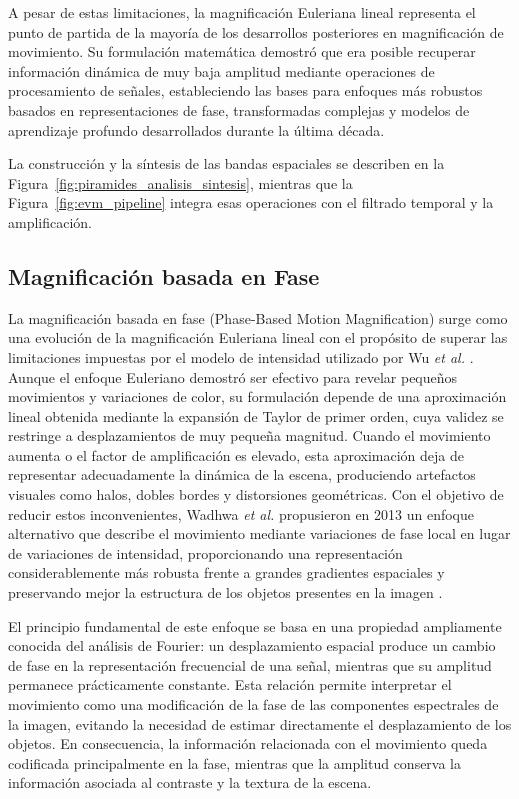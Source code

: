 A pesar de estas limitaciones, la magnificación Euleriana lineal representa el punto de partida de la mayoría de los desarrollos posteriores en magnificación de movimiento. Su formulación matemática demostró que era posible recuperar información dinámica de muy baja amplitud mediante operaciones de procesamiento de señales, estableciendo las bases para enfoques más robustos basados en representaciones de fase, transformadas complejas y modelos de aprendizaje profundo desarrollados durante la última década.

La construcción y la síntesis de las bandas espaciales se describen en la Figura~\ref{fig:piramides_analisis_sintesis}, mientras que la Figura~\ref{fig:evm_pipeline} integra esas operaciones con el filtrado temporal y la amplificación.

	\subsection{Magnificación basada en Fase}

La magnificación basada en fase (Phase-Based Motion Magnification) surge como una evolución de la magnificación Euleriana lineal con el propósito de superar las limitaciones impuestas por el modelo de intensidad utilizado por Wu \textit{et al.} \cite{wu2012eulerian}. Aunque el enfoque Euleriano demostró ser efectivo para revelar pequeños movimientos y variaciones de color, su formulación depende de una aproximación lineal obtenida mediante la expansión de Taylor de primer orden, cuya validez se restringe a desplazamientos de muy pequeña magnitud. Cuando el movimiento aumenta o el factor de amplificación es elevado, esta aproximación deja de representar adecuadamente la dinámica de la escena, produciendo artefactos visuales como halos, dobles bordes y distorsiones geométricas. Con el objetivo de reducir estos inconvenientes, Wadhwa \textit{et al.} propusieron en 2013 un enfoque alternativo que describe el movimiento mediante variaciones de fase local en lugar de variaciones de intensidad, proporcionando una representación considerablemente más robusta frente a grandes gradientes espaciales y preservando mejor la estructura de los objetos presentes en la imagen \cite{wadhwa2013phase}.

El principio fundamental de este enfoque se basa en una propiedad ampliamente conocida del análisis de Fourier: un desplazamiento espacial produce un cambio de fase en la representación frecuencial de una señal, mientras que su amplitud permanece prácticamente constante. Esta relación permite interpretar el movimiento como una modificación de la fase de las componentes espectrales de la imagen, evitando la necesidad de estimar directamente el desplazamiento de los objetos. En consecuencia, la información relacionada con el movimiento queda codificada principalmente en la fase, mientras que la amplitud conserva la información asociada al contraste y la textura de la escena.

